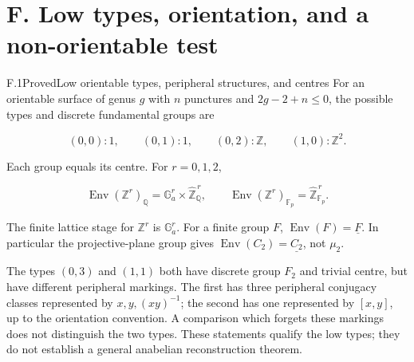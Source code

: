 \section{F. Low types, orientation, and a non-orientable test}

\begin{statement}{F.1}{Proved}{Low orientable types, peripheral structures, and centres}
For an orientable surface of genus $g$ with $n$ punctures and
$2g-2+n\leq0$, the possible types and discrete fundamental groups are

$$
(0,0):1,\qquad (0,1):1,\qquad (0,2):\mathbb Z,\qquad
 (1,0):\mathbb Z^2.
$$

Each group equals its centre. For $r=0,1,2$,

$$
\operatorname{Env}(\mathbb Z^r)_{\mathbb Q}
 =\mathbb G_a^r\times\widehat{\mathbb Z}^{\,r}_{\mathbb Q},
 \qquad
 \operatorname{Env}(\mathbb Z^r)_{\mathbb F_p}
 =\widehat{\mathbb Z}^{\,r}_{\mathbb F_p}.
$$

The finite lattice stage for $\mathbb Z^r$ is $\mathbb G_a^r$.
For a finite group $F$, $\operatorname{Env}(F)=\underline F$.
In particular the projective-plane group gives
$\operatorname{Env}(C_2)=\underline{C_2}$, not $\mu_2$.

The types $(0,3)$ and $(1,1)$ both have discrete group $F_2$ and
trivial centre, but have different peripheral markings. The first
has three peripheral conjugacy classes represented by
$x,y,(xy)^{-1}$; the second has one represented by $[x,y]$,
up to the orientation convention. A comparison which forgets
these markings does not distinguish the two types.
These statements qualify the low types; they do not establish a
general anabelian reconstruction theorem.
\end{statement}
